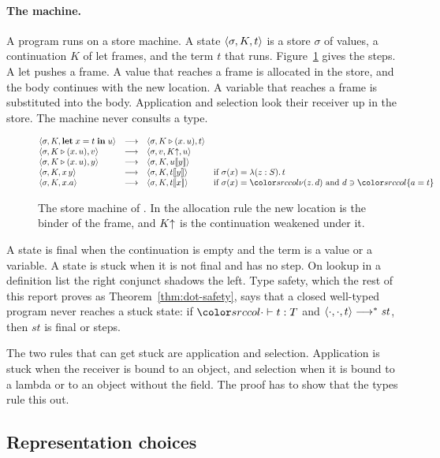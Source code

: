 \paragraph{The machine.}
A program runs on a store machine. A state $\langle \sigma, K, t\rangle$ is a store $\sigma$ of values, a continuation $K$ of let frames, and the term $t$ that runs. Figure~\ref{fig:source-machine} gives the steps. A let pushes a frame. A value that reaches a frame is allocated in the store, and the body continues with the new location. A variable that reaches a frame is substituted into the body. Application and selection look their receiver up in the store. The machine never consults a type.
\begin{figure}
\small
\color{srccol}
\[
\begin{array}{@{}lcll@{}}
\mst{\sigma}{K}{\klet x = t \kin u} &\step& \mst{\sigma}{K \triangleright (x.\,u)}{t} \\
\mst{\sigma}{K \triangleright (x.\,u)}{v} &\step& \mst{\sigma, v}{\weak{K}}{u} \\
\mst{\sigma}{K \triangleright (x.\,u)}{y} &\step& \mst{\sigma}{K}{\inst{u}{y}} \\
\mst{\sigma}{K}{x\,y} &\step& \mst{\sigma}{K}{\inst{t}{y}} & \text{if } \sigma(x) = \lambda(z : S).\,t \\
\mst{\sigma}{K}{x.a} &\step& \mst{\sigma}{K}{\inst{t}{x}} & \text{if } \sigma(x) = \dnew{z}{d} \text{ and } d \ni \ddeftrm{a}{t}
\end{array}
\]
\color{black}
\caption{The store machine of \DOTMNF. In the allocation rule the new location is the binder of the frame, and $K{\uparrow}$ is the continuation weakened under it.}
\label{fig:source-machine}
\end{figure}
A state is final when the continuation is empty and the term is a value or a variable. A state is stuck when it is not final and has no step. On lookup in a definition list the right conjunct shadows the left. Type safety, which the rest of this report proves as Theorem~\ref{thm:dot-safety}, says that a closed well-typed program never reaches a stuck state: if $\dtyj{\cdot}{t}{T}$ and $\langle \cdot, \cdot, t\rangle \longrightarrow^{*} \mathit{st}$, then $\mathit{st}$ is final or steps.

The two rules that can get stuck are application and selection. Application is stuck when the receiver is bound to an object, and selection when it is bound to a lambda or to an object without the field. The proof has to show that the types rule this out.

\subsection{Representation choices}\label{sec:source-details}

